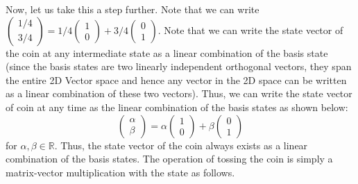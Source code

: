 Now, let us take this a step further. Note that we can write $\begin{pmatrix} 1/4 \\ 3/4 \end{pmatrix} = 1/4 \begin{pmatrix} 1 \\ 0 \end{pmatrix} + 3/4 \begin{pmatrix} 0 \\1\end{pmatrix}$. Note that we can write the state vector of the coin at any intermediate state as a linear combination of the basis state (since the basis states are two linearly independent orthogonal vectors, they span the entire 2D Vector space and hence any vector in the 2D space can be written as a linear combination of these two vectors). Thus, we can write the state vector of coin at any time as the linear combination of the basis states as shown below:
\[
\begin{pmatrix} \alpha \\ \beta \end{pmatrix} = \alpha \begin{pmatrix} 1 \\ 0 \end{pmatrix} + \beta \begin{pmatrix} 0 \\ 1 \end{pmatrix}
\]
for $\alpha, \beta \in \mathbb{R}$. Thus, the state vector of the coin always exists as a linear combination of the basis states. The operation of tossing the coin is simply a matrix-vector multiplication with the state as follows.
